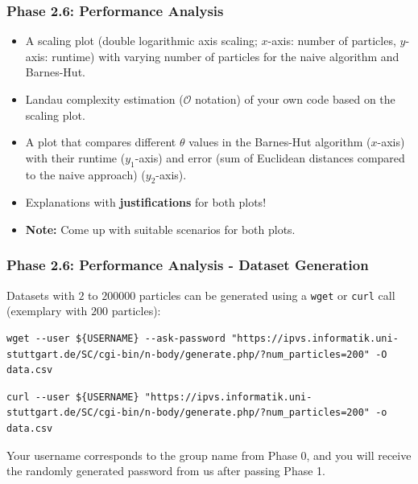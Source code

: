 \begin{frame}[fragile]
    \frametitle{Phase 2.6: Performance Analysis}
    \begin{itemize}
    \item A scaling plot (double logarithmic axis scaling; $x$-axis: number of particles, $y$-axis: runtime) with varying number of particles for the naive algorithm and Barnes-Hut.
    \item Landau complexity estimation ($\mathcal{O}$ notation) of your own code based on the scaling plot.
    \item A plot that compares different $\theta$ values in the Barnes-Hut algorithm ($x$-axis) with their runtime ($y_1$-axis) and error (sum of Euclidean distances compared to the naive approach) ($y_2$-axis).
    \item Explanations with \textbf{justifications} for both plots!
    \item \textbf{Note:} Come up with suitable scenarios for both plots.
    \end{itemize}
\end{frame}

%
\begin{frame}[fragile]
    \frametitle{Phase 2.6: Performance Analysis - Dataset Generation}

    Datasets with $\num{2}$ to $\num{200000}$ particles can be generated using a \texttt{wget} or \texttt{curl} call (exemplary with $\num{200}$ particles):

    {
        \setfontsize{7.7pt}
        \begin{verbatim}
wget --user ${USERNAME} --ask-password "https://ipvs.informatik.uni-stuttgart.de/SC/cgi-bin/n-body/generate.php/?num_particles=200" -O data.csv
        \end{verbatim}
        \vspace*{-2em}
        \begin{verbatim}
curl --user ${USERNAME} "https://ipvs.informatik.uni-stuttgart.de/SC/cgi-bin/n-body/generate.php/?num_particles=200" -o data.csv
        \end{verbatim}
    }

    Your username corresponds to the group name from Phase 0, and you will receive the randomly generated password from us after passing Phase 1.
\end{frame}

